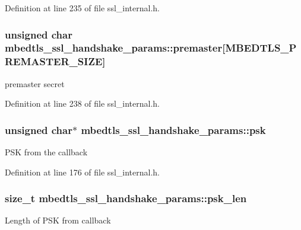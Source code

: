 Definition at line 235 of file ssl\-\_\-internal.\-h.

\hypertarget{structmbedtls__ssl__handshake__params_a2a6bbee172aff64433acb004134616a3}{
\subsubsection[{premaster}]{\setlength{\rightskip}{0pt plus 5cm}unsigned char mbedtls\-\_\-ssl\-\_\-handshake\-\_\-params\-::premaster\mbox{[}M\-B\-E\-D\-T\-L\-S\-\_\-\-P\-R\-E\-M\-A\-S\-T\-E\-R\-\_\-\-S\-I\-Z\-E\mbox{]}}}\label{structmbedtls__ssl__handshake__params_a2a6bbee172aff64433acb004134616a3}
premaster secret 

Definition at line 238 of file ssl\-\_\-internal.\-h.

\hypertarget{structmbedtls__ssl__handshake__params_a249e9ec2254eef073c3ead5544139415}{
\subsubsection[{psk}]{\setlength{\rightskip}{0pt plus 5cm}unsigned char$\ast$ mbedtls\-\_\-ssl\-\_\-handshake\-\_\-params\-::psk}}\label{structmbedtls__ssl__handshake__params_a249e9ec2254eef073c3ead5544139415}
P\-S\-K from the callback 

Definition at line 176 of file ssl\-\_\-internal.\-h.

\hypertarget{structmbedtls__ssl__handshake__params_ac91fb6cfeeda006fa2b9a1749186d216}{
\subsubsection[{psk\-\_\-len}]{\setlength{\rightskip}{0pt plus 5cm}size\-\_\-t mbedtls\-\_\-ssl\-\_\-handshake\-\_\-params\-::psk\-\_\-len}}\label{structmbedtls__ssl__handshake__params_ac91fb6cfeeda006fa2b9a1749186d216}
Length of P\-S\-K from callback 

